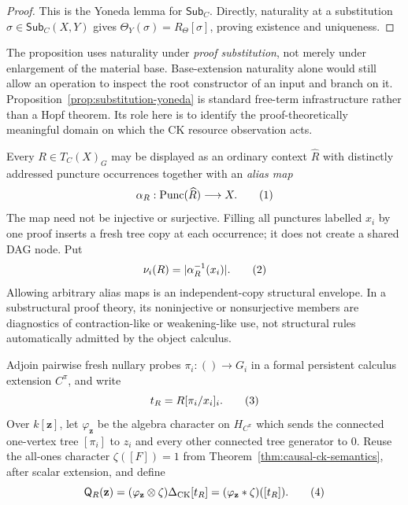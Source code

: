 \documentclass[10pt,a4paper]{article}
\theoremstyle{plain}
\theoremstyle{definition}
\theoremstyle{remark}
\newcommand{\DeltaCK}{\Delta_{\mathrm{CK}}}
\newcommand{\Punc}{\operatorname{Punc}}
\newcommand{\eqtag}{\refstepcounter{equation}\tag{\theequation}}
\begin{document}
\begin{proof}
This is the Yoneda lemma for \(\mathsf{Sub}_C\).  Directly, naturality at a
substitution \(\sigma\in\mathsf{Sub}_C(X,Y)\) gives
\(\Theta_Y(\sigma)=R_\Theta[\sigma]\), proving existence and uniqueness.
\end{proof}

The proposition uses naturality under \emph{proof substitution}, not merely
under enlargement of the material base.  Base-extension naturality alone
would still allow an operation to inspect the root constructor of an input
and branch on it.  Proposition~\ref{prop:substitution-yoneda} is standard
free-term infrastructure rather than a Hopf theorem.  Its role here is to
identify the proof-theoretically meaningful domain on which the CK resource
observation acts.

Every \(R\in T_C(X)_G\) may be displayed as an ordinary context
\(\widehat R\) with distinctly addressed puncture occurrences together with
an \emph{alias map}
\[
                 \alpha_R:\Punc(\widehat R)\longrightarrow X.
\eqtag\label{eq:independent-alias-map}
\]
The map need not be injective or surjective.  Filling all punctures labelled
\(x_i\) by one proof inserts a fresh tree copy at each occurrence; it does
not create a shared DAG node.  Put
\[
                 \nu_i(R)=|\alpha_R^{-1}(x_i)|.
\eqtag\label{eq:input-use-number}
\]
Allowing arbitrary alias maps is an independent-copy structural envelope.
In a substructural proof theory, its noninjective or nonsurjective members
are diagnostics of contraction-like or weakening-like use, not structural
rules automatically admitted by the object calculus.

Adjoin pairwise fresh nullary probes
\(\pi_i:()\to G_i\) in a formal persistent calculus extension \(C^\pi\), and
write
\[
                  t_R=R[\pi_i/x_i]_i.
\eqtag\label{eq:resource-probe-filling}
\]
Over \(k[\mathbf z]\), let \(\varphi_{\mathbf z}\) be the algebra character
on \(H_{C^\pi}\) which sends the connected one-vertex tree
\([\pi_i]\) to \(z_i\) and every other connected tree generator to \(0\).
Reuse the all-ones character \(\zeta([F])=1\) from
Theorem~\ref{thm:causal-ck-semantics}, after scalar extension, and define
\[
 \mathsf Q_R(\mathbf z)
    =(\varphi_{\mathbf z}\otimes\zeta)\DeltaCK[t_R]
    =(\varphi_{\mathbf z}*\zeta)([t_R]).
\eqtag\label{eq:ck-resource-polynomial}
\]
\end{document}
